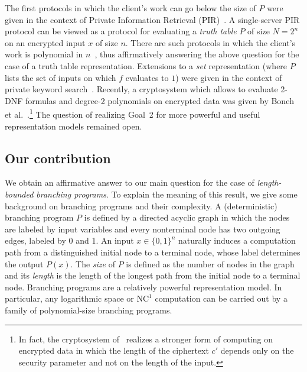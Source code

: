 \documentclass{article}
\newcommand{\nc}[1]{{\mathrm{NC}^{#1}}}
\newcommand{\NCone}{{\nc{1}}}
\begin{document}
The first protocols in which the client's work can go below the
size of $P$ were given in the context of Private Information
Retrieval (PIR)~\cite{CGKS95,KO97}. A single-server PIR
protocol can be viewed as a protocol for evaluating a {\em
truth table} $P$ of size $N=2^n$ on an encrypted input $x$ of
size $n$. There are such protocols in which the client's work
is polynomial in $n$~\cite{cms99,L04}, thus affirmatively
answering the above question for the case of a truth table
representation.
Extensions to a {\em set} representation (where $P$ lists the set
of inputs on which $f$ evaluates to $1$) were given in the context
of private keyword search~\cite{KO97,CGN,FIPR05,OS}. Recently, a cryptosystem which allows to evaluate 2-DNF formulas and degree-2
polynomials on encrypted data was given by Boneh et
al.~\cite{BGN}.\footnote{In fact, the cryptosystem of~\cite{BGN} realizes a stronger form of computing on encrypted data in which the length
of the ciphertext $c'$ depends only on the security parameter and
not on the length of the input. } The question of realizing Goal~2
for more powerful and useful representation models remained open.

\subsection{Our contribution}

We obtain an affirmative answer to our main question for the case of
{\em length-bounded branching programs}. To explain the meaning of
this result, we give some background on branching programs and their
complexity. A (deterministic) branching program $P$ is defined by a
directed acyclic graph in which the nodes are labeled by input
variables and every nonterminal node has two outgoing edges, labeled
by 0 and 1. An input $x\in\{0,1\}^n$ naturally induces a computation
path from a distinguished initial node to a terminal node, whose
label determines the output $P(x)$. The {\em size} of $P$ is defined
as the number of nodes in the graph and its {\em length} is the
length of the longest path from the initial node to a terminal node.
Branching programs are a relatively powerful representation model.
In particular, any logarithmic space or $\NCone$ computation can be
carried out by a family of polynomial-size branching programs.
\end{document}
